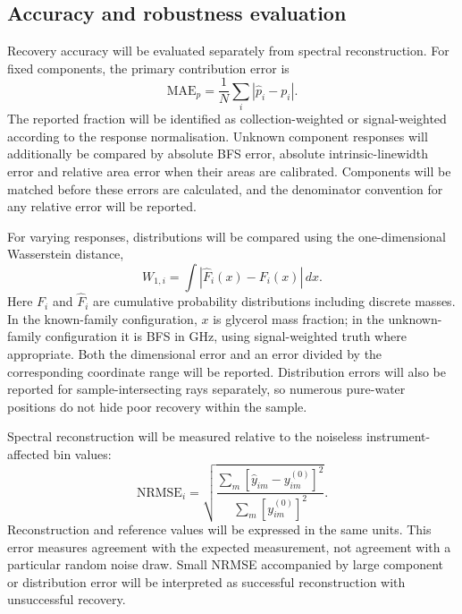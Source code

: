 \documentclass[11pt]{article}
\begin{document}
\subsection{Accuracy and robustness evaluation}

Recovery accuracy will be evaluated separately from spectral reconstruction. For fixed components, the primary contribution error is
\begin{equation}
 \mathrm{MAE}_{p}=\frac{1}{N}\sum_i|\widehat p_i-p_i|.
 \label{eq:proportion_mae}
\end{equation}
The reported fraction will be identified as collection-weighted or signal-weighted according to the response normalisation. Unknown component responses will additionally be compared by absolute BFS error, absolute intrinsic-linewidth error and relative area error when their areas are calibrated. Components will be matched before these errors are calculated, and the denominator convention for any relative error will be reported.

For varying responses, distributions will be compared using the one-dimensional Wasserstein distance,
\begin{equation}
 W_{1,i}=\int|\widehat F_i(x)-F_i(x)|\,dx.
 \label{eq:wasserstein}
\end{equation}
Here $F_i$ and $\widehat F_i$ are cumulative probability distributions including discrete masses. In the known-family configuration, $x$ is glycerol mass fraction; in the unknown-family configuration it is BFS in GHz, using signal-weighted truth where appropriate. Both the dimensional error and an error divided by the corresponding coordinate range will be reported. Distribution errors will also be reported for sample-intersecting rays separately, so numerous pure-water positions do not hide poor recovery within the sample.

Spectral reconstruction will be measured relative to the noiseless instrument-affected bin values:
\begin{equation}
 \mathrm{NRMSE}_i=
 \sqrt{\frac{\sum_m[\widehat y_{im}-y^{(0)}_{im}]^2}
 {\sum_m[y^{(0)}_{im}]^2}}.
 \label{eq:spectral_nrmse}
\end{equation}
Reconstruction and reference values will be expressed in the same units. This error measures agreement with the expected measurement, not agreement with a particular random noise draw. Small NRMSE accompanied by large component or distribution error will be interpreted as successful reconstruction with unsuccessful recovery.
\end{document}
